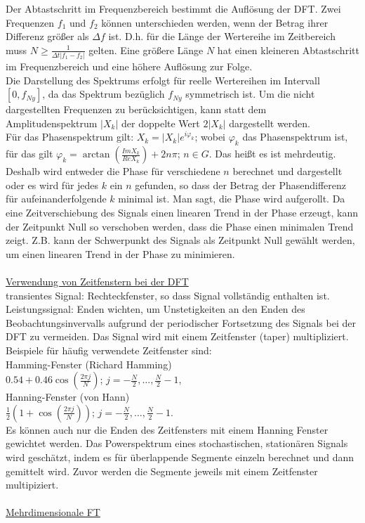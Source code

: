 Der Abtastschritt im Frequenzbereich bestimmt die Auflösung der DFT. Zwei Frequenzen $f_1$ und $f_2$ können unterschieden werden, wenn der Betrag ihrer Differenz größer als $ \Delta f$ ist. D.h. für die Länge der Wertereihe im Zeitbereich muss $N \ge \frac{1}{\Delta t | f_1 - f_2 |}$ gelten. Eine größere Länge $N$ hat einen kleineren Abtastschritt im Frequenzbereich und eine höhere Auflösung zur Folge. \\
Die Darstellung des Spektrums erfolgt für reelle Wertereihen im Intervall $[0,f_{Ny}]$, da das Spektrum bezüglich $f_{Ny}$ symmetrisch ist. Um die nicht dargestellten Frequenzen zu berücksichtigen, kann statt dem Amplitudenspektrum $|X_k|$ der doppelte Wert $2|X_k|$ dargestellt werden. \\
Für das Phasenspektrum gilt: $X_k= |X_k|e^{i\varphi_k}$; wobei $\varphi_k$ das Phasenspektrum ist, für das gilt  
$\varphi_k = \arctan (\frac{Im X_k}{Re X_k}) + 2n\pi$; $n \in G$. Das heißt es ist mehrdeutig. Deshalb wird entweder die Phase für verschiedene $n$ berechnet und dargestellt oder es wird für jedes $k$ ein $n$ gefunden, so dass der Betrag der Phasendifferenz für aufeinanderfolgende $k$ minimal ist. Man sagt, die Phase wird aufgerollt. Da eine Zeitverschiebung des Signals einen linearen Trend in der Phase erzeugt, kann der Zeitpunkt Null so verschoben werden, dass die Phase einen minimalen Trend zeigt. Z.B. kann der Schwerpunkt des Signals als Zeitpunkt Null gewählt werden, um einen linearen Trend in der Phase zu minimieren.\\
\\
\underline{Verwendung von Zeitfenstern bei der DFT}\\
transientes Signal: Rechteckfenster, so dass Signal vollständig enthalten ist. \\
Leistungssignal: Enden wichten, um Unstetigkeiten an den Enden des Beobachtungsinvervalls aufgrund der periodischer Fortsetzung des Signals bei der DFT zu vermeiden. Das Signal wird mit einem Zeitfenster (taper) multipliziert. Beispiele für häufig verwendete Zeitfenster sind:\\
Hamming-Fenster (Richard Hamming)\\
$0.54+0.46\cos(\frac{2\pi j}{N})$; $j=-\frac{N}{2},\dots, \frac{N}{2}-1$,\\
Hanning-Fenster (von Hann)\\
$\frac{1}{2}(1+\cos(\frac{2\pi j}{N}))$; $j=-\frac{N}{2},\dots, \frac{N}{2}-1$.\\
Es können auch nur die Enden des Zeitfensters mit einem Hanning Fenster gewichtet werden.
Das Powerspektrum eines stochastischen, stationären Signals wird geschätzt, indem es für überlappende Segmente einzeln berechnet und dann gemittelt wird. Zuvor werden die Segmente jeweils mit einem Zeitfenster multipiziert.
\\
\\
\underline{Mehrdimensionale FT}

